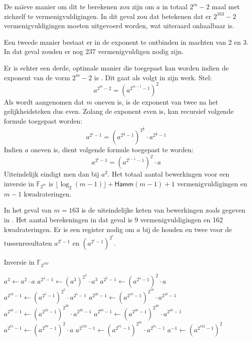 
De na\"ieve manier om dit te berekenen zou zijn om $a$ in totaal $2^m - 2$ maal met zichzelf te vermenigvuldigingen. In dit geval zou dat betekenen dat er $2^{163} - 2$ vermenigvuldigingen moeten uitgevoerd worden, wat uiteraard onhaalbaar is.

Een tweede manier bestaat er in de exponent te ontbinden in machten van 2 en 3. In dat geval zouden er nog 237 vermenigvuldigen nodig zijn.

Er is echter een derde, optimale manier die toegepast kan worden indien de exponent van de vorm $2^m - 2$ is \cite{batina-pkc, itoh}. Dit gaat als volgt in zijn werk. Stel:
\[a^{2^m - 2} = (a^{2^{m - 1} - 1})^2\]
Als wordt aangenomen dat $m$ oneven is, is de exponent van twee na het gelijkheidsteken dus even. Zolang de exponent even is, kan recursief volgende formule toegepast worden:
\[a^{2^i - 1} = (a^{2^{\frac{i}{2}} - 1})^{2^{\frac{i}{2}}} \cdot a^{2^{\frac{i}{2}} - 1}\]
Indien $a$ oneven is, dient volgende formule toegepast te worden:
\[a^{2^i - 1} = (a^{2^{i - 1} - 1})^2 \cdot a\]
Uiteindelijk eindigt men dan bij $a^2$. Het totaal aantal bewerkingen voor een inversie in $\mathbb{F}_{2^m}$ is $\lfloor\log_2(m - 1)\rfloor + \textsf{Hamm}(m - 1) + 1$ vermenigvuldigingen en $m - 1$ kwadrateringen.

In het geval van $m = 163$ is de uiteindelijke keten van bewerkingen zoals gegeven in . Het aantal berekeningen in dat geval is 9 vermenigvuldigingen en 162 kwadrateringen. Er is een register nodig om $a$ bij de houden en twee voor de tussenresultaten $a^{2^i - 1}$ en $(a^{2^i - 1})^{2^i}$.

\begin{algorithm}[h]
	\caption{Inversie in $\mathbb{F}_{2^{163}}$}
	\label{algoritme-implementatie-miller-inversie}
	$a^3 \gets a^2 \cdot a$\;
	$a^{2^4 - 1} \gets (a^3)^{2^2} \cdot a^3$\;
	$a^{2^5 - 1} \gets (a^{2^4 - 1})^2 \cdot a$\;
	$a^{2^{10} - 1} \gets (a^{2^5 - 1})^{2^5} \cdot a^{2^5 - 1}$\;
	$a^{2^{20} - 1} \gets (a^{2^{10} - 1})^{2^{10}} \cdot a^{2^{10} - 1}$\;
	$a^{2^{40} - 1} \gets (a^{2^{20} - 1})^{2^{20}} \cdot a^{2^{20} - 1}$\;
	$a^{2^{80} - 1} \gets (a^{2^{40} - 1})^{2^{40}} \cdot a^{2^{40} - 1}$\;
	$a^{2^{81} - 1} \gets (a^{2^{80} - 1})^2 \cdot a$\;
	$a^{2^{162} - 1} \gets (a^{2^{81} - 1})^{2^{81}} \cdot a^{2^{81} - 1}$\;
	$a^{-1} \gets (a^{2^{162} - 1})^2$\;
\end{algorithm}

